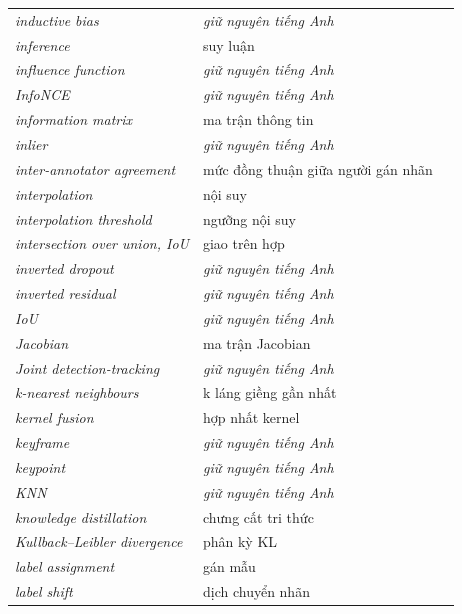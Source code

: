 \documentclass[deep_learning.tex]{subfiles}
\begin{document}
\begin{longtable}{@{}L{5.2cm}L{5.9cm}L{2.6cm}@{}}
\emph{inductive bias} & \emph{\color{tiercol}giữ nguyên tiếng Anh} & \\
\emph{inference} & suy luận & \\
\emph{influence function} & \emph{\color{tiercol}giữ nguyên tiếng Anh} & \\
\emph{InfoNCE} & \emph{\color{tiercol}giữ nguyên tiếng Anh} & \\
\emph{information matrix} & ma trận thông tin & \\
\emph{inlier} & \emph{\color{tiercol}giữ nguyên tiếng Anh} & \\
\emph{inter-annotator agreement} & mức đồng thuận giữa người gán nhãn & \\
\emph{interpolation} & nội suy & \\
\emph{interpolation threshold} & ngưỡng nội suy & \\
\emph{intersection over union, IoU} & giao trên hợp & \\
\emph{inverted dropout} & \emph{\color{tiercol}giữ nguyên tiếng Anh} & \\
\emph{inverted residual} & \emph{\color{tiercol}giữ nguyên tiếng Anh} & \\
\emph{IoU} & \emph{\color{tiercol}giữ nguyên tiếng Anh} & \\
\emph{Jacobian} & ma trận Jacobian & \\
\emph{Joint detection-tracking} & \emph{\color{tiercol}giữ nguyên tiếng Anh} & \\
\emph{k-nearest neighbours} & k láng giềng gần nhất & \\
\emph{kernel fusion} & hợp nhất kernel & \\
\emph{keyframe} & \emph{\color{tiercol}giữ nguyên tiếng Anh} & \\
\emph{keypoint} & \emph{\color{tiercol}giữ nguyên tiếng Anh} & \\
\emph{KNN} & \emph{\color{tiercol}giữ nguyên tiếng Anh} & \\
\emph{knowledge distillation} & chưng cất tri thức & \\
\emph{Kullback--Leibler divergence} & phân kỳ KL & \\
\emph{label assignment} & gán mẫu & \\
\emph{label shift} & dịch chuyển nhãn & \\

\end{longtable}
\end{document}
